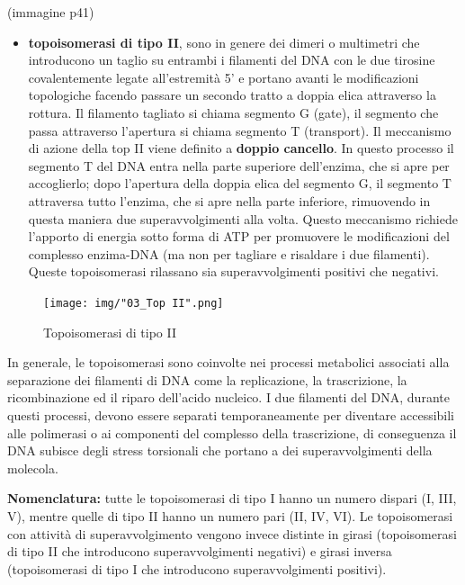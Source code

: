 \documentclass[11pt]{book}
\begin{document}
(immagine p41)

\clearpage

\begin{itemize}
\itemsep1pt\parskip0pt
\item
  \textbf{topoisomerasi di tipo II}, sono in genere dei dimeri o
  multimetri che introducono un taglio su entrambi i filamenti del DNA
  con le due tirosine covalentemente legate all'estremità 5' e portano
  avanti le modificazioni topologiche facendo passare un secondo tratto
  a doppia elica attraverso la rottura. Il filamento tagliato si chiama
  segmento G (gate), il segmento che passa attraverso l'apertura si
  chiama segmento T (transport). Il meccanismo di azione della top II
  viene definito a \textbf{doppio cancello}. In questo processo il
  segmento T del DNA entra nella parte superiore dell'enzima, che si
  apre per accoglierlo; dopo l'apertura della doppia elica del segmento
  G, il segmento T attraversa tutto l'enzima, che si apre nella parte
  inferiore, rimuovendo in questa maniera due superavvolgimenti alla
  volta. Questo meccanismo richiede l'apporto di energia sotto forma di
  ATP per promuovere le modificazioni del complesso enzima-DNA (ma non
  per tagliare e risaldare i due filamenti). Queste topoisomerasi
  rilassano sia superavvolgimenti positivi che negativi.
\end{itemize}

\begin{figure}[htp]
\centering
\texttt{[image: img/"03\_Top II".png]}
\caption{Topoisomerasi di tipo II}
\label{Top-II}
\end{figure}

In generale, le topoisomerasi sono coinvolte nei processi metabolici
associati alla separazione dei filamenti di DNA come la replicazione, la
trascrizione, la ricombinazione ed il riparo dell'acido nucleico. I due
filamenti del DNA, durante questi processi, devono essere separati
temporaneamente per diventare accessibili alle polimerasi o ai
componenti del complesso della trascrizione, di conseguenza il DNA
subisce degli stress torsionali che portano a dei superavvolgimenti
della molecola.

\textbf{Nomenclatura:} tutte le topoisomerasi di tipo I hanno un numero
dispari (I, III, V), mentre quelle di tipo II hanno un numero pari (II,
IV, VI). Le topoisomerasi con attività di superavvolgimento vengono
invece distinte in girasi (topoisomerasi di tipo II che introducono
superavvolgimenti negativi) e girasi inversa (topoisomerasi di tipo I
che introducono superavvolgimenti positivi).
\end{document}
